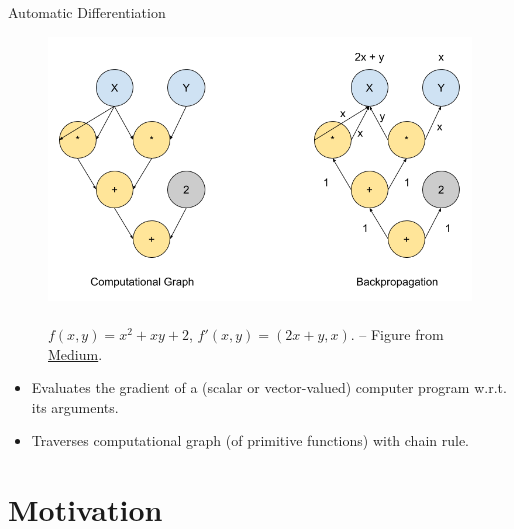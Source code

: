 \documentclass{beamer}
\begin{document}
\begin{frame}{Automatic Differentiation}

    \begin{figure}
        \begin{minipage}[c]{0.7\textwidth}
            \includegraphics[scale=0.3]{imgs/autograd.png}
        \end{minipage}
        \begin{minipage}[l]{0.27\textwidth}
            \caption{
            \\$f(x,y) = x^2+xy+2$, $f'(x,y) = (2x+y,x).$
            -- Figure from \href{https://avinashselvam.medium.com/automatic-differentiation-explained-9f02c74e9a90}{Medium}.}
        \end{minipage}
        \label{fig:autograd-illustration}
    \end{figure}
    
    \begin{itemize}
        \item Evaluates the gradient of a (scalar or vector-valued) computer program w.r.t. its arguments.
        \item \pause Traverses computational graph (of primitive functions) with chain rule.
    \end{itemize}
    
\end{frame}


\section{Motivation}
\end{document}
